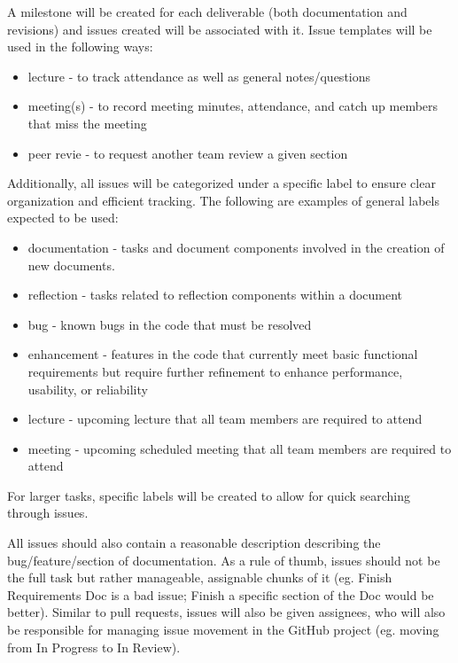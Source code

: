 \documentclass{article}
\begin{document}
A milestone will be created for each deliverable (both documentation and revisions) and issues
created will be associated with it. Issue templates will be used in the following ways:

\begin{itemize}
  \item lecture - to track attendance as well as general notes/questions
  \item meeting(s) - to record meeting minutes, attendance, and catch up members that miss the meeting
  \item peer revie - to request another team review a given section
\end{itemize}

Additionally, all issues will be categorized under a specific label to ensure clear organization and efficient tracking. The following are examples of general labels expected to be used:

\begin{itemize}
  \item documentation - tasks and document components involved in the creation of new documents.
  \item reflection - tasks related to reflection components within a document
  \item bug - known bugs in the code that must be resolved
  \item enhancement - features in the code that currently meet basic functional requirements but require further refinement to enhance performance, usability, or reliability
  \item lecture - upcoming lecture that all team members are required to attend
  \item meeting - upcoming scheduled meeting that all team members are required to attend
\end{itemize}

For larger tasks, specific labels will be created to allow for quick searching through issues.

All issues should also contain a reasonable description describing the bug/feature/section of documentation.
As a rule of thumb, issues should not be the full task but rather manageable, assignable chunks of it (eg. Finish Requirements Doc is a bad issue; Finish a specific section of the Doc would be better). Similar to pull requests, issues will also be given assignees, who will also be responsible for managing issue movement in the GitHub project (eg. moving from In Progress to In Review).
\end{document}
